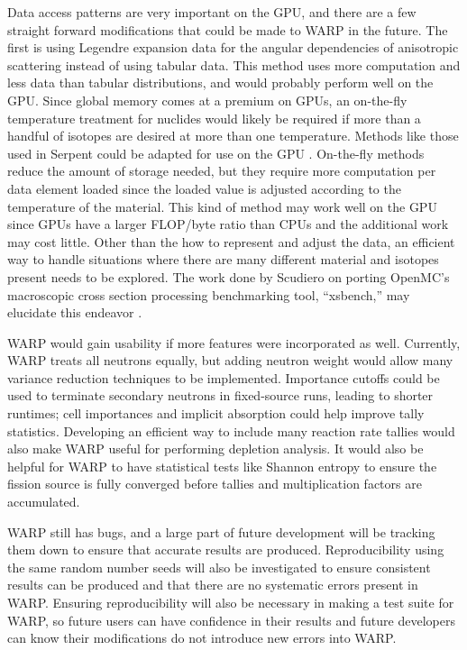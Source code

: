 \documentclass[preprint,12pt]{elsarticle}
\begin{document}
Data access patterns are very important on the GPU, and there are a few straight forward modifications that could be made to WARP in the future.  The first is using Legendre expansion data for the angular dependencies of anisotropic scattering instead of using tabular data.  This method uses more computation and less data than tabular distributions, and would probably perform well on the GPU.  Since global memory comes at a premium on GPUs, an on-the-fly temperature treatment for nuclides would likely be required if more than a handful of isotopes are desired at more than one temperature.  Methods like those used in Serpent could be adapted for use on the GPU \cite{serpent}.  On-the-fly methods reduce the amount of storage needed, but they require more computation per data element loaded since the loaded value is adjusted according to the temperature of the material.  This kind of method may work well on the GPU since GPUs have a larger FLOP/byte ratio than CPUs and the additional work may cost little.  Other than the how to represent and adjust the data, an efficient way to handle situations where there are many different material and isotopes present needs to be explored.  The work done by Scudiero on porting OpenMC's macroscopic cross section processing benchmarking tool, ``xsbench,'' may elucidate this endeavor \cite{openmc,scudiero}.

WARP would gain usability if more features were incorporated as well.  Currently, WARP treats all neutrons equally, but adding neutron weight would allow many variance reduction techniques to be implemented.  Importance cutoffs could be used to terminate secondary neutrons in fixed-source runs, leading to shorter runtimes; cell importances and implicit absorption could help improve tally statistics.  Developing an efficient way to include many reaction rate tallies would also make WARP useful for performing depletion analysis.  It would also be helpful for WARP to have statistical tests like Shannon entropy to ensure the fission source is fully converged before tallies and multiplication factors are accumulated.

WARP still has bugs, and a large part of future development will be tracking them down to ensure that accurate results are produced.  Reproducibility using the same random number seeds will also be investigated to ensure consistent results can be produced and that there are no systematic errors present in WARP.  Ensuring reproducibility will also be necessary in making a test suite for WARP, so future users can have confidence in their results and future developers can know their modifications do not introduce new errors into WARP.
\end{document}

